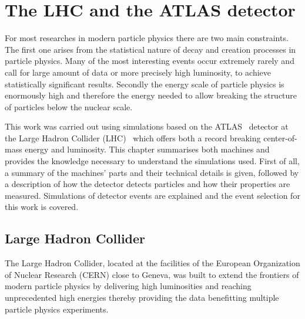 

\chapter{The LHC and the ATLAS detector}
\label{lhc_atlas}


For most researches in modern particle physics there are two main constraints. The first one arises from the statistical nature of decay and creation processes in particle physics. Many of the most interesting events occur extremely rarely and call for large amount of data or more precisely high luminosity, to achieve statistically significant results. Secondly the energy scale of particle physics is enormously high and therefore the energy needed to allow breaking the structure of particles below the nuclear scale. 

This work was carried out using simulations based on the ATLAS~\cite{atlas} detector at the Large Hadron Collider (LHC)~\cite{lhc_machine} which offers both a record breaking center-of-mass energy and luminosity. This chapter summarises both machines and provides the knowledge necessary to understand the simulations used. First of all, a summary of the machines' parts and their technical details is given, followed by a description of how the detector detects particles and how their properties are measured. Simulations of detector events are explained and the event selection for this work is covered.

\section{Large Hadron Collider}

The Large Hadron Collider, located at the facilities of the European Organization of Nuclear Research (CERN) close to Geneva, was built to extend the frontiers of modern particle physics by delivering high luminosities and reaching unprecedented high energies thereby providing the data benefitting multiple particle physics experiments.

